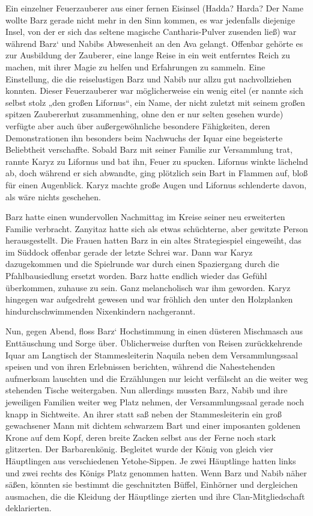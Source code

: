 Ein einzelner Feuerzauberer aus einer fernen Eisinsel (Hadda? Harda? Der Name wollte Barz gerade nicht mehr in den Sinn kommen, es war jedenfalls diejenige Insel, von der er sich das seltene magische Cantharis-Pulver zusenden ließ) war während Barz‘ und Nabibs Abwesenheit an den Ava gelangt. Offenbar gehörte es zur Ausbildung der Zauberer, eine lange Reise in ein weit entferntes Reich zu machen, mit ihrer Magie zu helfen und Erfahrungen zu sammeln. Eine Einstellung, die die reiselustigen Barz und Nabib nur allzu gut nachvollziehen konnten. Dieser Feuerzauberer war möglicherweise ein wenig eitel (er nannte sich selbst stolz „den großen Lifornus“, ein Name, der nicht zuletzt mit seinem großen spitzen Zaubererhut zusammenhing, ohne den er nur selten gesehen wurde) verfügte aber auch über außergewöhnliche besondere Fähigkeiten, deren Demonstrationen ihn besonders beim Nachwuchs der Iquar eine begeisterte Beliebtheit verschaffte. Sobald Barz mit seiner Familie zur Versammlung trat, rannte Karyz zu Lifornus und bat ihn, Feuer zu spucken. Lifornus winkte lächelnd ab, doch während er sich abwandte, ging plötzlich sein Bart in Flammen auf, bloß für einen Augenblick. Karyz machte große Augen und Lifornus schlenderte davon, als wäre nichts geschehen.

Barz hatte einen wundervollen Nachmittag im Kreise seiner neu erweiterten Familie verbracht. Zanyitaz hatte sich als etwas schüchterne, aber gewitzte Person herausgestellt. Die Frauen hatten Barz in ein altes Strategiespiel eingeweiht, das im Süddock offenbar gerade der letzte Schrei war. Dann war Karyz dazugekommen und die Spielrunde war durch einen Spaziergang durch die Pfahlbausiedlung ersetzt worden. Barz hatte endlich wieder das Gefühl überkommen, zuhause zu sein. Ganz melancholisch war ihm geworden. Karyz hingegen war aufgedreht gewesen und war fröhlich den unter den Holzplanken hindurchschwimmenden Nixenkindern nachgerannt.

Nun, gegen Abend, floss Barz‘ Hochstimmung in einen düsteren Mischmasch aus Enttäuschung und Sorge über. Üblicherweise durften von Reisen zurückkehrende Iquar am Langtisch der Stammesleiterin Naquila neben dem Versammlungssaal speisen und von ihren Erlebnissen berichten, während die Nahestehenden aufmerksam lauschten und die Erzählungen nur leicht verfälscht an die weiter weg stehenden Tische weitergaben. Nun allerdings mussten Barz, Nabib und ihre jeweiligen Familien weiter weg Platz nehmen, der Versammlungssaal gerade noch knapp in Sichtweite. An ihrer statt saß neben der Stammesleiterin ein groß gewachsener Mann mit dichtem schwarzem Bart und einer imposanten goldenen Krone auf dem Kopf, deren breite Zacken selbst aus der Ferne noch stark glitzerten. Der Barbarenkönig. Begleitet wurde der König von gleich vier Häuptlingen aus verschiedenen Yetohe-Sippen. Je zwei Häuptlinge hatten links und zwei rechts des Königs Platz genommen hatten. Wenn Barz und Nabib näher säßen, könnten sie bestimmt die geschnitzten Büffel, Einhörner und dergleichen ausmachen, die die Kleidung der Häuptlinge zierten und ihre Clan-Mitgliedschaft deklarierten.

